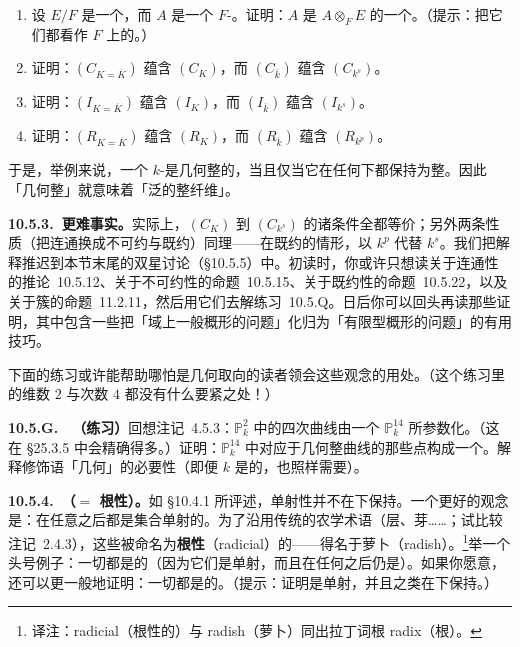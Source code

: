 \begin{exercise}\label{ex:geometric-fiber-condition-implications}
\begin{enumerate}[label=(\alph*)]
  \item 设 $E/F$ 是一个\trFieldExtension，而 $A$ 是一个 $F$-\trAlgebra。证明：$A$ 是 $A\otimes_F E$ 的一个\trSubalgebra。（提示：把它们都看作 $F$ 上的\trVectorSpace。）
  \item 证明：$(C_{K=\overline{K}})$ 蕴含 $(C_K)$，而 $(C_{\overline{k}})$ 蕴含 $(C_{k^s})$。
  \item 证明：$(I_{K=\overline{K}})$ 蕴含 $(I_K)$，而 $(I_{\overline{k}})$ 蕴含 $(I_{k^s})$。
  \item 证明：$(R_{K=\overline{K}})$ 蕴含 $(R_K)$，而 $(R_{\overline{k}})$ 蕴含 $(R_{k^p})$。
\end{enumerate}
\end{exercise}

于是，举例来说，一个 $k$-\trScheme{}是几何整的，当且仅当它在任何\trFieldExtension{}下都保持为整。因此「几何整」就意味着「泛的整纤维」。

\textbf{10.5.3.\ 更难事实。}\quad 实际上，$(C_K)$ 到 $(C_{k^s})$ 的诸条件全都等价；另外两条性质（把连通换成不可约与既约）同理——在既约的情形，以 $k^p$ 代替 $k^s$。我们把解释推迟到本节末尾的双星讨论（\S10.5.5）中。初读时，你或许只想读关于连通性的推论~10.5.12、关于不可约性的命题~10.5.15、关于既约性的命题~10.5.22，以及关于簇的命题~11.2.11，然后用它们去解\mbox{练习~10.5.Q}。日后你可以回头再读那些证明，其中包含一些把「域上一般概形的问题」化归为「有限型概形的问题」的有用技巧。

下面的练习或许能帮助哪怕是几何取向的读者领会这些观念的用处。（这个练习里的维数 $2$ 与次数 $4$ 都没有什么要紧之处！）

\textbf{10.5.G.}\ \hard\ \textbf{（练习）}\quad 回想注记~4.5.3：$\mathbb{P}^2_k$ 中的四次曲线由一个 $\mathbb{P}^{14}_k$ 所参数化。（这在 \S25.3.5 中会精确得多。）证明：$\mathbb{P}^{14}_k$ 中对应于几何整曲线的那些点构成一个\trOpenSubset。解释修饰语「几何」的必要性（即便 $k$ 是\trAlgClosed{}的，也照样需要）。

\textbf{10.5.4.\ \trUniversallyInjective{}（$=$ 根性）\trMorphism。}\quad 如 \S10.4.1 所评述，单射性并不在\trBaseChange{}下保持。一个更好的观念是\trUniversallyInjective{}\trMorphism：在任意\trBaseChange{}之后都是集合单射的\trMorphism。为了沿用传统的农学术语（层、芽……；试比较注记~2.4.3），这些\trMorphism{}被命名为\textbf{根性}（radicial）的——得名于萝卜（radish）。\footnote{译注：radicial（根性的）与 radish（萝卜）同出拉丁词根 radix（根）。}举一个头号例子：一切\trLocally\trClosedEmbedding{}都是\trUniversallyInjective{}的（因为它们是单射，而且在任何\trBaseChange{}之后仍是\trLocally\trClosedEmbedding）。如果你愿意，还可以更一般地证明：一切\trMonomorphism{}都是\trUniversallyInjective{}的。（提示：证明\trMonomorphism{}是单射，并且\trMonomorphism{}之类在\trBaseChange{}下保持。）

